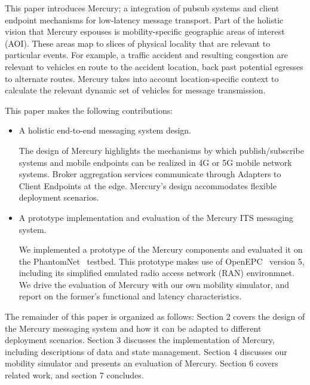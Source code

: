 This paper introduces Mercury; a integration of pubsub systems and
client endpoint mechanisms for low-latency message transport.  Part of
the holistic vision that Mercury espouses is mobility-specific
geographic areas of interest (AOI). These areas map to slices of
physical locality that are relevant to particular events.  For
example, a traffic accident and resulting congestion are relevant to
vehicles en route to the accident location, back past potential
egresses to alternate routes.  Mercury takes into account
location-specific context to calculate the relevant dynamic set of
vehicles for message transmission.

This paper makes the following contributions:
\begin{itemize}

\item A holistic end-to-end messaging system design.

The design of Mercury highlights the mechanisms by which
publish/subscribe systems and mobile endpoints can be realized in 4G
or 5G mobile network systems. Broker aggregation services communicate
through Adapters to Client Endpoints at the edge. Mercury's design
accommodates flexible deployment scenarios.

\item A prototype implementation and evaluation of the Mercury ITS
  messaging system.

We implemented a prototype of the Mercury components and evaluated it
on the PhantomNet~\cite{banerjee2015phantomnet} testbed.  This
prototype makes use of OpenEPC~\cite{corici2010openepc} version 5,
including its simplified emulated radio access network (RAN)
environmnet. We drive the evaluation of Mercury with our own mobility
simulator, and report on the former's functional and latency
characteristics.

\end{itemize}

The remainder of this paper is organized as follows: Section 2 covers
the design of the Mercury messaging system and how it can be adapted
to different deployment scenarios.  Section 3 discusses the
implementation of Mercury, including descriptions of data and state
management. Section 4 discusses our mobility simulator and presents an
evaluation of Mercury.  Section 6 covers related work, and section 7
concludes.
